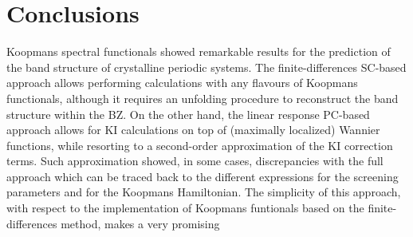 \section{Conclusions\label{sec:results-conclusions}}
Koopmans spectral functionals showed remarkable results for the prediction of the band structure of crystalline periodic systems. The finite-differences SC-based approach allows performing calculations with any flavours of Koopmans functionals, although it requires an unfolding procedure to reconstruct the band structure within the BZ. On the other hand, the linear response PC-based approach allows for KI calculations on top of (maximally localized) Wannier functions, while resorting to a second-order approximation of the KI correction terms. Such approximation showed, in some cases, discrepancies with the full approach which can be traced back to the different expressions for the screening parameters and for the Koopmans Hamiltonian. The simplicity of this approach, with respect to the implementation of Koopmans funtionals based on the finite-differences method, makes a very promising 

